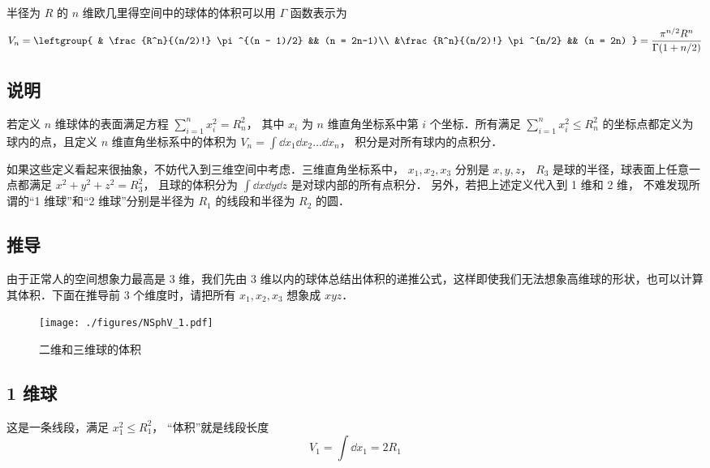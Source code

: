 
半径为 $R$ 的 $n$ 维欧几里得空间中的球体的体积可以用 $\Gamma$ 函数表示为
\begin{equation}
V_n = \leftgroup{
& \frac{R^n}{(n/2)!} \pi^{(n - 1)/2} && (n = 2n-1)\\
&\frac{R^n}{(n/2)!} \pi^{n/2} && (n = 2n)
} = \frac{\pi^{n/2} R^n}{\Gamma (1 + n/2)}
\end{equation}
 
\subsection{说明}
若定义 $n$ 维球体的表面满足方程 $\sum_{i=1}^n x_i^2 = R_n^2$， 其中 $x_i$ 为 $n$ 维直角坐标系中第 $i$ 个坐标．所有满足 $\sum_{i=1}^n x_i^2 \leqslant R_n^2$ 的坐标点都定义为球内的点，且定义 $n$ 维直角坐标系中的体积为 $V_n = \int \dd{x_1}\dd{x_2}\dots\dd{x_n}$， 积分是对所有球内的点积分．

如果这些定义看起来很抽象，不妨代入到三维空间中考虑．三维直角坐标系中， $x_1, x_2, x_3$ 分别是 $x,y,z$，  $R_3$ 是球的半径，球表面上任意一点都满足 $x^2 + y^2 + z^2 = R_3^2$， 且球的体积分为 $\int \dd{x}\dd{y}\dd{z}$ 是对球内部的所有点积分． 另外，若把上述定义代入到 1 维和 2 维， 不难发现所谓的“1 维球”和“2 维球”分别是半径为 $R_1$ 的线段和半径为 $R_2$ 的圆．

\subsection{推导}
由于正常人的空间想象力最高是 3 维，我们先由 3 维以内的球体总结出体积的递推公式，这样即使我们无法想象高维球的形状，也可以计算其体积．下面在推导前 3 个维度时，请把所有 $x_1, x_2, x_3$ 想象成 $xyz$． 
\begin{figure}[ht]
\centering
\texttt{[image: ./figures/NSphV\_1.pdf]}
\caption{二维和三维球的体积}
\end{figure}
\subsection{1 维球}
这是一条线段，满足 $x_1^2 \leqslant R_1^2$， “体积”就是线段长度
\begin{equation}\label{NSphV_eq1}
V_1 = \int \dd{x_1} = 2 R_1
\end{equation}
